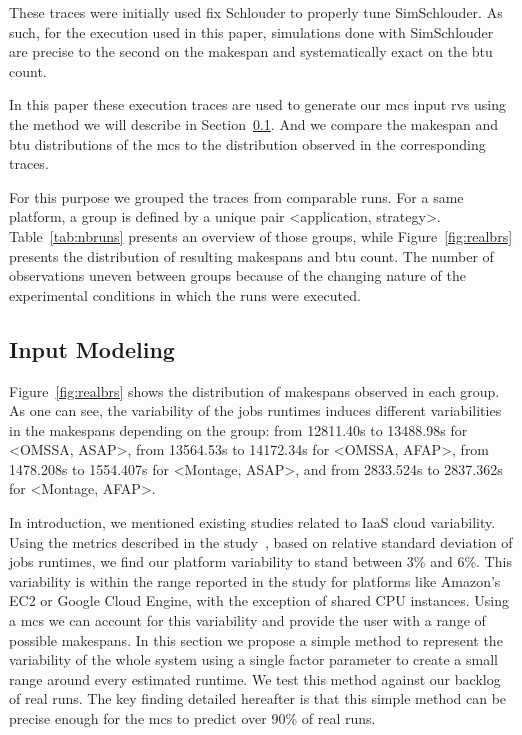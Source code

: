 \documentclass[10pt,conference,compsocconf]{IEEEtran}
\begin{document}
These traces were initially used fix Schlouder to properly 
tune SimSchlouder. As such, for the execution used in this paper, simulations
done with SimSchlouder are precise to the second on the makespan and
systematically exact on the \ac{btu} count. 

In this paper these execution traces are used to  generate our \ac{mcs} input
\acp{rv} using the method we will describe in Section~\ref{sec:im}. And we
compare the makespan  and \ac{btu}  distributions of the \ac{mcs} to the
distribution observed in the corresponding traces.

For this purpose we grouped the traces  from comparable runs.  For a same platform, 
a group is defined by a unique pair <application, strategy>.  
Table~\ref{tab:nbruns}  presents  an  overview   of  those groups,  while
Figure~\ref{fig:realbrs} presents the distribution of resulting makespans and \ac{btu} count.
The number of observations uneven between groups because of  the changing nature of
the    experimental   conditions    in   which    the   runs    were   executed.


\subsection{Input Modeling}\label{sec:im}

Figure~\ref{fig:realbrs} shows the distribution of makespans observed in each 
group. As one can see, the variability of the jobs runtimes induces different
variabilities in the makespans depending on the group:
from 12811.40s to 13488.98s for <OMSSA, ASAP>,
from 13564.53s to 14172.34s for <OMSSA, AFAP>,
from 1478.208s to 1554.407s for <Montage, ASAP>, and
from 2833.524s to 2837.362s for <Montage, AFAP>.

In introduction,
we mentioned existing studies related to IaaS cloud variability. Using the
metrics described in the study~\cite{LeitnerC16}, based on relative standard
deviation of jobs runtimes, we find our platform variability to stand between
3\% and 6\%. This variability is within the range reported in the study for
platforms like Amazon's EC2 or Google Cloud Engine, with the exception of shared
CPU instances.
Using a  \ac{mcs} we can account for this  variability and provide the
user with  a range of  possible makespans. In this  section we propose  a simple
method to  represent the variability of  the whole system using  a single factor
parameter to create  a small range around every estimated  runtime. We test this %
method against our backlog of real  runs.  The key finding detailed hereafter is
that this simple method  can be precise enough for the  \ac{mcs} to predict over
90\% of real runs.
\end{document}
